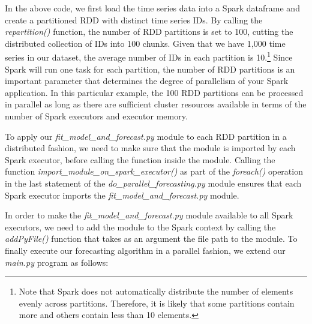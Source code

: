\documentclass[11pt]{article}
\begin{document}
In the above code, we first load the time series data into a Spark dataframe and create a partitioned RDD with distinct time series IDs. By calling the \emph{repartition()} function, the number of RDD partitions is set to 100, cutting the distributed collection of IDs into 100 chunks. Given that we have 1,000 time series in our dataset, the average number of IDs in each partition is 10.\footnote{Note that Spark does not automatically distribute the number of elements evenly across partitions. Therefore, it is likely that some partitions contain more and others contain less than 10 elements.} Since Spark will run one task for each partition, the number of RDD partitions is an important parameter that determines the degree of parallelism of your Spark application. In this particular example, the 100 RDD partitions can be processed in parallel as long as there are sufficient cluster resources available in terms of the number of Spark executors and executor memory. 

\begin{sloppypar}
To apply our \emph{fit\_model\_and\_forecast.py} module to each RDD partition in a distributed fashion, we need to make sure that the module is imported by each Spark executor, before calling the function inside the module. Calling the function \emph{import\_module\_on\_spark\_executor()} as part of the \emph{foreach()} operation in the last statement of the \emph{do\_parallel\_forecasting.py} module ensures that each Spark executor imports the \emph{fit\_model\_and\_forecast.py} module.
\end{sloppypar}

In order to make the \emph{fit\_model\_and\_forecast.py} module available to all Spark executors, we need to add the module to the Spark context by calling the \emph{addPyFile()} function that takes as an argument the file path to the module. To finally execute our forecasting algorithm in a parallel fashion, we extend our \emph{main.py} program as follows:
\end{document}
